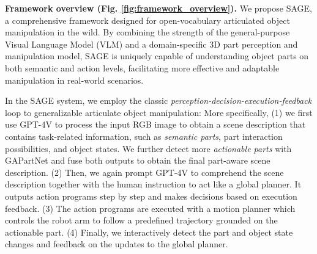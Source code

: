 \noindent \textbf{Framework overview (Fig. \ref{fig:framework_overview}).} We propose SAGE, a comprehensive framework designed for open-vocabulary articulated object manipulation in the wild. By combining the strength of the general-purpose Visual Language Model (VLM) and a domain-specific 3D part perception and manipulation model, SAGE is uniquely capable of understanding object parts on both semantic and action levels, facilitating more effective and adaptable manipulation in real-world scenarios.

In the SAGE system, we employ the classic \textit{perception-decision-execution-feedback} loop to generalizable articulate object manipulation:
More specifically, (1) we first use GPT-4V to process the input RGB image to obtain a scene description that contains task-related information, such as \textit{semantic parts}, part interaction possibilities, and object states. We further detect more \textit{actionable parts} with GAPartNet and fuse both outputs to obtain the final part-aware scene description. (2) Then, we again prompt GPT-4V to comprehend the scene description together with the human instruction to act like a global planner. It outputs action programs step by step and makes decisions based on execution feedback. (3) The action programs are executed with a motion planner which controls the robot arm to follow a predefined trajectory grounded on the actionable part. (4) Finally, we interactively detect the part and object state changes and feedback on the updates to the global planner.


